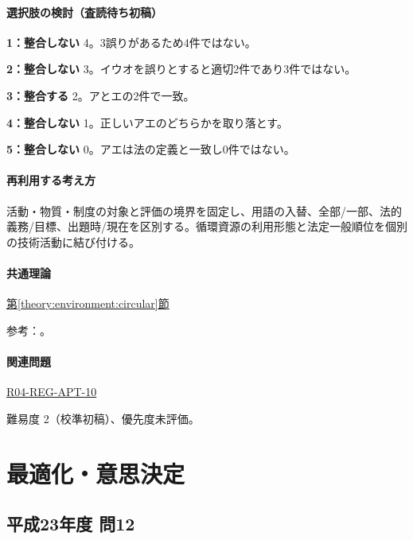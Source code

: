 \paragraph{選択肢の検討（査読待ち初稿）}\mbox{}\par

\noindent\textbf{1：整合しない} 4。3誤りがあるため4件ではない。\par

\noindent\textbf{2：整合しない} 3。イウオを誤りとすると適切2件であり3件ではない。\par

\noindent\textbf{3：整合する} 2。アとエの2件で一致。\par

\noindent\textbf{4：整合しない} 1。正しいアエのどちらかを取り落とす。\par

\noindent\textbf{5：整合しない} 0。アエは法の定義と一致し0件ではない。\par

\paragraph{再利用する考え方} 活動・物質・制度の対象と評価の境界を固定し、用語の入替、全部/一部、法的義務/目標、出題時/現在を区別する。循環資源の利用形態と法定一般順位を個別の技術活動に結び付ける。

\paragraph{共通理論} \hyperref[theory:environment:circular]{第\ref*{theory:environment:circular}節}

\par 参考：\cite{env_circular_law}。

\paragraph{関連問題} \hyperref[q:r04-reg-apt-10]{R04-REG-APT-10}

\par 難易度 2（校準初稿）、優先度未評価。

\section{最適化・意思決定}

\subsection{平成23年度 問12}
\label{q:h23-reg-apt-12}

